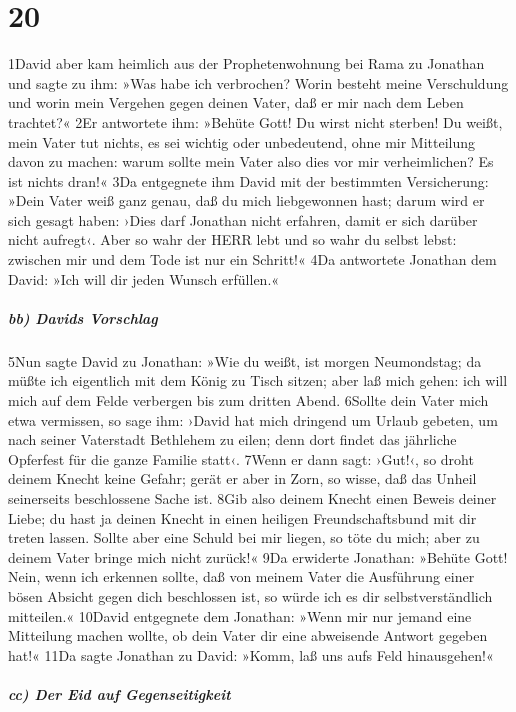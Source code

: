 \hypertarget{section-19}{%
\section{20}\label{section-19}}

1David aber kam heimlich aus der Prophetenwohnung bei Rama zu Jonathan
und sagte zu ihm: »Was habe ich verbrochen? Worin besteht meine
Verschuldung und worin mein Vergehen gegen deinen Vater, daß er mir nach
dem Leben trachtet?« 2Er antwortete ihm: »Behüte Gott! Du wirst nicht
sterben! Du weißt, mein Vater tut nichts, es sei wichtig oder
unbedeutend, ohne mir Mitteilung davon zu machen: warum sollte mein
Vater also dies vor mir verheimlichen? Es ist nichts dran!« 3Da
entgegnete ihm David mit der bestimmten Versicherung: »Dein Vater weiß
ganz genau, daß du mich liebgewonnen hast; darum wird er sich gesagt
haben: ›Dies darf Jonathan nicht erfahren, damit er sich darüber nicht
aufregt‹. Aber so wahr der HERR lebt und so wahr du selbst lebst:
zwischen mir und dem Tode ist nur ein Schritt!« 4Da antwortete Jonathan
dem David: »Ich will dir jeden Wunsch erfüllen.«

\hypertarget{bb-davids-vorschlag}{%
\subparagraph{bb) Davids Vorschlag}\label{bb-davids-vorschlag}}

5Nun sagte David zu Jonathan: »Wie du weißt, ist morgen Neumondstag; da
müßte ich eigentlich mit dem König zu Tisch sitzen; aber laß mich gehen:
ich will mich auf dem Felde verbergen bis zum dritten Abend. 6Sollte
dein Vater mich etwa vermissen, so sage ihm: ›David hat mich dringend um
Urlaub gebeten, um nach seiner Vaterstadt Bethlehem zu eilen; denn dort
findet das jährliche Opferfest für die ganze Familie statt‹. 7Wenn er
dann sagt: ›Gut!‹, so droht deinem Knecht keine Gefahr; gerät er aber in
Zorn, so wisse, daß das Unheil seinerseits beschlossene Sache ist. 8Gib
also deinem Knecht einen Beweis deiner Liebe; du hast ja deinen Knecht
in einen heiligen Freundschaftsbund mit dir treten lassen. Sollte aber
eine Schuld bei mir liegen, so töte du mich; aber zu deinem Vater bringe
mich nicht zurück!« 9Da erwiderte Jonathan: »Behüte Gott! Nein, wenn ich
erkennen sollte, daß von meinem Vater die Ausführung einer bösen Absicht
gegen dich beschlossen ist, so würde ich es dir selbstverständlich
mitteilen.« 10David entgegnete dem Jonathan: »Wenn mir nur jemand eine
Mitteilung machen wollte, ob dein Vater dir eine abweisende Antwort
gegeben hat!« 11Da sagte Jonathan zu David: »Komm, laß uns aufs Feld
hinausgehen!«

\hypertarget{cc-der-eid-auf-gegenseitigkeit}{%
\subparagraph{cc) Der Eid auf
Gegenseitigkeit}\label{cc-der-eid-auf-gegenseitigkeit}}

